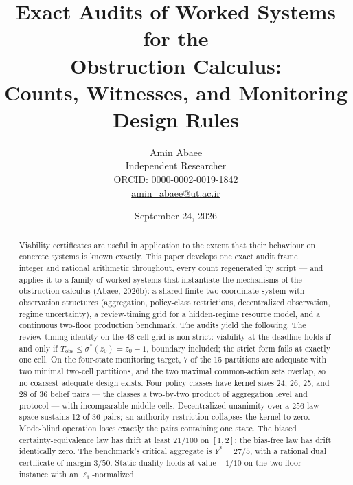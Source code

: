 \documentclass[10pt,twocolumn]{article}
\theoremstyle{definition}
\begin{document}
\title{Exact Audits of Worked Systems for the\\
Obstruction Calculus:\\
Counts, Witnesses, and Monitoring Design Rules}
\author{Amin Abaee\\[0.35em]
{\small Independent Researcher}\\[0.55em]
{\small\href{https://orcid.org/0000-0002-0019-1842}{ORCID: 0000-0002-0019-1842}}\\[0.3em]
{\small\href{mailto:amin\_abaee@ut.ac.ir}{amin\_abaee@ut.ac.ir}}}
\date{September 24, 2026}
\maketitle

\begin{abstract}
Viability certificates are useful in application to the extent that their
behaviour on concrete systems is known exactly. This paper develops one
exact audit frame --- integer and rational arithmetic throughout, every
count regenerated by script --- and applies it to a family of worked
systems that instantiate the mechanisms of the obstruction calculus
(Abaee, 2026b): a shared finite two-coordinate system with observation
structures (aggregation, policy-class restrictions, decentralized
observation, regime uncertainty), a review-timing grid for a
hidden-regime resource model, and a continuous two-floor production
benchmark. The audits yield the following. The review-timing identity on
the 48-cell grid is non-strict: viability at the deadline holds if and
only if \(T_{\mathrm{obs}} \le \sigma^{*}(z_0) = z_0 - 1\), boundary
included; the strict form fails at exactly one cell. On the four-state
monitoring target, 7 of the 15 partitions are adequate with two minimal
two-cell partitions, and the two maximal common-action sets overlap, so
no coarsest adequate design exists. Four policy classes have kernel
sizes 24, 26, 25, and 28 of 36 belief pairs --- the classes a two-by-two
product of aggregation level and protocol --- with incomparable middle
cells. Decentralized unanimity over a
\(256\)-law space sustains 12 of 36 pairs; an authority restriction
collapses the kernel to zero. Mode-blind operation loses exactly the
pairs containing one state. The biased certainty-equivalence law has
drift at least \(21/100\) on \([1,2]\); the bias-free law has drift
identically zero. The benchmark's critical aggregate is \(Y^{*} = 27/5\),
with a rational dual certificate of margin \(3/50\). Static duality
holds at value \(-1/10\) on the two-floor instance with an \(\ell_1\)-normalized

\end{abstract}
\end{document}
